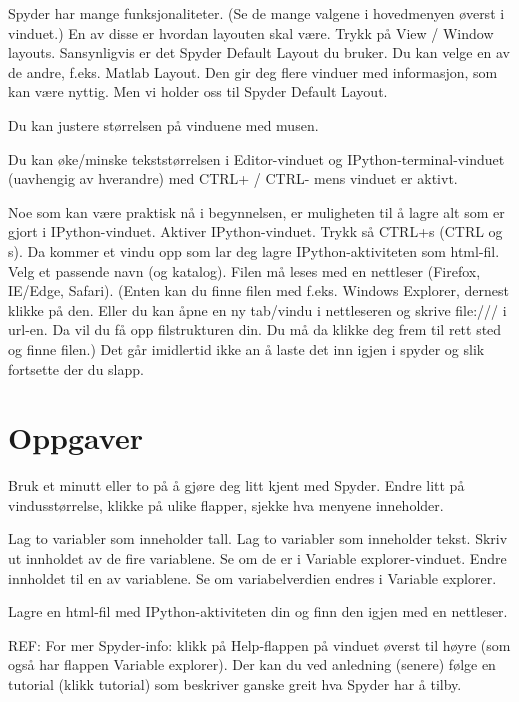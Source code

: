 Spyder har mange funksjonaliteter. (Se de mange valgene i hovedmenyen øverst i vinduet.) En av disse er hvordan layouten skal være. Trykk på View / Window layouts. Sansynligvis er det Spyder Default Layout du bruker. Du kan velge en av de andre, f.eks. Matlab Layout. Den gir deg flere vinduer med informasjon, som kan være nyttig. Men vi holder oss til Spyder Default Layout.

Du kan justere størrelsen på vinduene med musen.

Du kan øke/minske tekststørrelsen i Editor-vinduet og IPython-terminal-vinduet (uavhengig av hverandre) med CTRL+ / CTRL- mens vinduet er aktivt. 

Noe som kan være praktisk nå i begynnelsen, er muligheten til å lagre alt som er gjort i IPython-vinduet. Aktiver IPython-vinduet. Trykk så CTRL+s (CTRL og s). Da kommer et vindu opp som lar deg lagre IPython-aktiviteten som html-fil. Velg et passende navn (og katalog). Filen må leses med en nettleser (Firefox, IE/Edge, Safari). (Enten kan du finne filen med f.eks. Windows Explorer, dernest klikke på den. Eller du kan åpne en ny tab/vindu i nettleseren og skrive file:/// i url-en. Da vil du få opp filstrukturen din. Du må da klikke deg frem til rett sted og finne filen.) Det går imidlertid ikke an å laste det inn igjen i spyder og slik fortsette der du slapp. 

\section{Oppgaver}

\begin{question}
Bruk et minutt eller to på å gjøre deg litt kjent med Spyder. Endre litt på vindusstørrelse, klikke på ulike flapper, sjekke hva menyene inneholder.
\end{question}
\begin{question}
Lag to variabler som inneholder tall. Lag to variabler som inneholder tekst. Skriv ut innholdet av de fire variablene. Se om de er i Variable explorer-vinduet. Endre innholdet til en av variablene. Se om variabelverdien endres i Variable explorer.
\end{question}
\begin{question}
Lagre en html-fil med IPython-aktiviteten din og finn den igjen med en nettleser.
\end{question}

REF: For mer Spyder-info: klikk på Help-flappen på vinduet øverst til høyre (som også har flappen Variable explorer). Der kan du ved anledning (senere) følge en tutorial (klikk tutorial) som beskriver ganske greit hva Spyder har å tilby.

